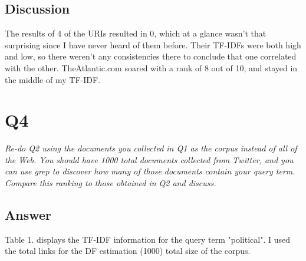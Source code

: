 \documentclass[12pt]{article}
\begin{document}
\subsection*{Discussion}
The results of 4 of the URIs resulted in 0, which at a glance wasn't that surprising since I have never heard of them before. Their TF-IDFs were both high and low, so there weren't any consistencies there to conclude that one correlated with the other. TheAtlantic.com soared with a rank of 8 out of 10, and stayed in the middle of my TF-IDF.

\section*{Q4}
\emph{Re-do Q2 using the documents you collected in Q1 as the corpus instead of all of the Web. You should have 1000 total documents collected from Twitter, and you can use grep to discover how many of those documents contain your query term. Compare this ranking to those obtained in Q2 and discuss.}


\subsection*{Answer}
Table 1. displays the TF-IDF information for the query term "political". I used the total links for the DF estimation (1000) total size of the corpus. 
\end{document}
